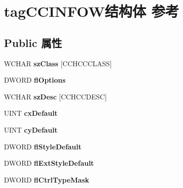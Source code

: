 \hypertarget{structtag_c_c_i_n_f_o_w}{}\section{tag\+C\+C\+I\+N\+F\+O\+W结构体 参考}
\label{structtag_c_c_i_n_f_o_w}
\subsection*{Public 属性}
\begin{DoxyCompactItemize}
\item 
\mbox{\label{structtag_c_c_i_n_f_o_w_ade74f7222d9d0daebf966f231f44b89a}} 
W\+C\+H\+AR {\bfseries sz\+Class} \mbox{[}C\+C\+H\+C\+C\+C\+L\+A\+SS\mbox{]}
\item 
\mbox{\label{structtag_c_c_i_n_f_o_w_a24c7d9754cccfe74a10e2a3c66d89c57}} 
D\+W\+O\+RD {\bfseries fl\+Options}
\item 
\mbox{\label{structtag_c_c_i_n_f_o_w_a3f6b685325ea90138933a470a5cdfdab}} 
W\+C\+H\+AR {\bfseries sz\+Desc} \mbox{[}C\+C\+H\+C\+C\+D\+E\+SC\mbox{]}
\item 
\mbox{\label{structtag_c_c_i_n_f_o_w_ac5bc4e9df2f66b67859ad237b0212910}} 
U\+I\+NT {\bfseries cx\+Default}
\item 
\mbox{\label{structtag_c_c_i_n_f_o_w_a14a490c250117b90cc4dfb4023490a07}} 
U\+I\+NT {\bfseries cy\+Default}
\item 
\mbox{\label{structtag_c_c_i_n_f_o_w_ab93e6c1907dfdb365eae0998ff43d3a8}} 
D\+W\+O\+RD {\bfseries fl\+Style\+Default}
\item 
\mbox{\label{structtag_c_c_i_n_f_o_w_ae9bc7a77dca3579fb0363dc62731df71}} 
D\+W\+O\+RD {\bfseries fl\+Ext\+Style\+Default}
\item 
\mbox{\label{structtag_c_c_i_n_f_o_w_adf313d8c3044bcff058d1bdf7ed9d493}} 
D\+W\+O\+RD {\bfseries fl\+Ctrl\+Type\+Mask}
\item 
\mbox{\label{structtag_c_c_i_n_f_o_w_ad8a907a96c9fff73825011ae89bce325}} 

\end{DoxyCompactItemize}
